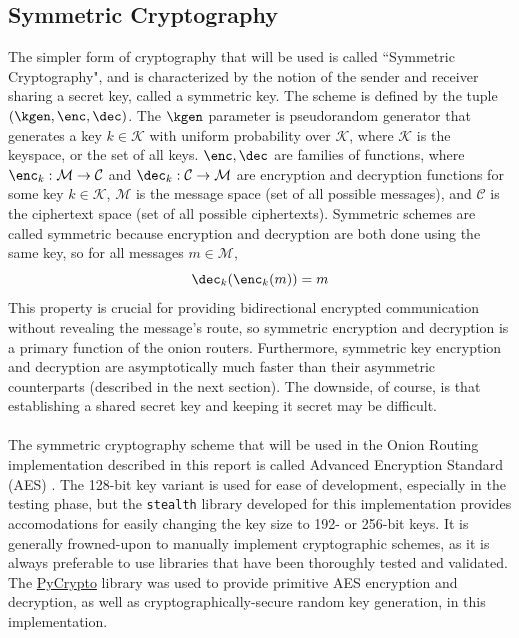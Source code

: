 \documentclass[10pt]{report}
\begin{document}
\begin{appendix}
    \section{Symmetric Cryptography}
    The simpler form of cryptography that will be used is called ``Symmetric Cryptography", and is
    characterized by the notion of the sender and receiver sharing a secret key, called a symmetric
    key. The scheme is defined by the tuple $(\kgen,\enc,\dec)$. The $\kgen$ parameter is pseudorandom
    generator that generates a key $k\in\mathcal{K}$ with uniform probability over $\mathcal{K}$,
    where $\mathcal{K}$ is the keyspace, or the set of all keys. $\enc,\dec$ are families of
    functions, where $\enc_k: \mathcal{M}\rightarrow\mathcal{C}$ and $\dec_k:
    \mathcal{C}\rightarrow\mathcal{M}$ are encryption and decryption functions for some key
    $k\in\mathcal{K}$, $\mathcal{M}$ is the message space (set of all possible messages), and
    $\mathcal{C}$ is the ciphertext space (set of all possible ciphertexts). Symmetric schemes are
    called symmetric because encryption and decryption are both done using the same key, so for all
    messages $m\in\mathcal{M}$,
    \begin{equation}
        \dec_k(\enc_k(m)) = m
    \end{equation}
    This property is crucial for providing bidirectional encrypted communication without revealing
    the message's route, so symmetric encryption and decryption is a primary function of the onion
    routers. Furthermore, symmetric key encryption and decryption are asymptotically much faster
    than their asymmetric counterparts \cite{SymmetricVsAsymmetric} (described in the next section).
    The downside, of course, is that establishing a shared secret key and keeping it secret may be
    difficult.\\\\
    The symmetric cryptography scheme that will be used in the Onion Routing
    implementation described in this report is called Advanced Encryption Standard (AES) \cite{AES}.
    The 128-bit key variant is used for ease of development, especially in the testing phase, but
    the \texttt{stealth} library developed for this implementation provides accomodations for easily
    changing the key size to 192- or 256-bit keys. It is generally frowned-upon to manually
    implement cryptographic schemes, as it is always preferable to use libraries that have been
    thoroughly tested and validated. The \href{https://www.dlitz.net/software/pycrypto/}{PyCrypto}
    library was used to provide primitive AES encryption and decryption, as well as
    cryptographically-secure random key generation, in this implementation.

\end{appendix}
\end{document}
